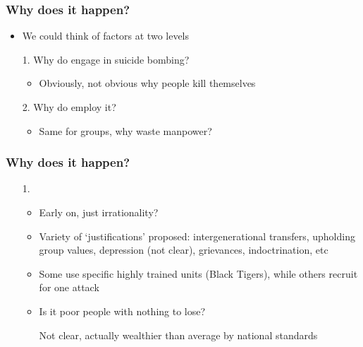 \documentclass[aspectratio=43]{beamer}
\begin{document}
\begin{frame}
\frametitle{Why does it happen?}
\centering

\begin{itemize}[<+->]
  \item We could think of factors at two levels
  \item[1.] Why do {\color{red}{individuals}} engage in suicide bombing?
  \begin{itemize}
    \item Obviously, not obvious why people kill themselves
  \end{itemize}
  \item[2.] Why do {\color{red}{groups}} employ it?
  \begin{itemize}
    \item Same for groups, why waste manpower?
  \end{itemize}
\end{itemize}

\end{frame}


\begin{frame}
\frametitle{Why does it happen?}
\centering

\begin{itemize}[<+->]
  \item[1.] {\color{red}{Individual motivations}}
  \begin{itemize}
    \item Early on, just irrationality?
    \item Variety of `justifications' proposed: intergenerational transfers, upholding group values, depression (not clear), grievances, indoctrination, etc
    \item Some use specific highly trained units (Black Tigers), while others recruit for one attack
    \item Is it poor people with nothing to lose?
    \item[] Not clear, actually wealthier than average by national standards
  \end{itemize}
\end{itemize}

\end{frame}
\end{document}
